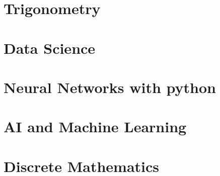 \documentclass[a4paper,12pt]{book}
\begin{document}
\chapter{Trigonometry}


\chapter{Data Science}

\chapter{Neural Networks with python}

\chapter{AI and Machine Learning}

\chapter{Discrete Mathematics}

\end{document}
